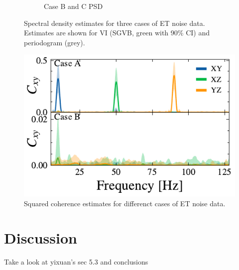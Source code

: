 \documentclass[%
 reprint,
 amsmath,amssymb,
 aps,
 nofootinbib,
]{revtex4-2}
\begin{document}
\begin{figure}[h]
\begin{subfigure}{\columnwidth}
  \caption{Case B and C PSD}
  \label{fig:caseBC_psd}
\end{subfigure}
\caption{Spectral density estimates for three cases of ET noise data. Estimates are shown for VI (SGVB, green with 90\% CI) and periodogram (grey).}
\label{fig:test}
\end{figure}

\begin{figure}
  \includegraphics[width=\columnwidth]{caseAB_coh.pdf}
  \caption{Squared coherence estimates for differenct cases of ET noise data.}
  \label{caseAB_coh}
\end{figure}







\section{Discussion}


Take a look at yixuan's sec 5.3 and conclusions 





\end{document}
